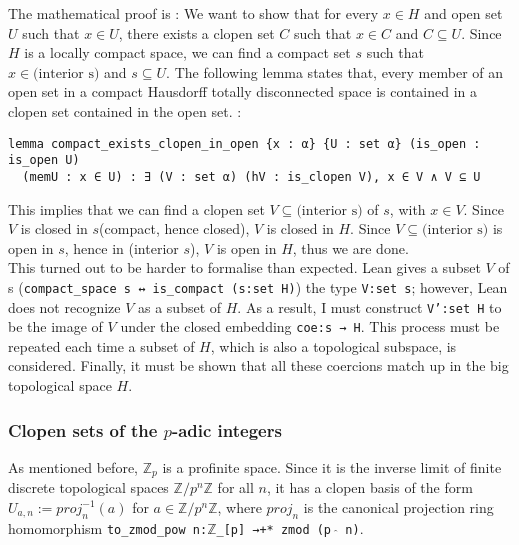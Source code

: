 \documentclass[a4paper,UKenglish,cleveref, autoref, thm-restate]{lipics-v2021}
\newcommand{\lean}[1]{\texttt{#1}\xspace} %
\begin{document}
The mathematical proof is : We want to show that for every $x \in H$ and open set $U$ such that
$x \in U$, there exists a clopen set $C$ such that $x \in C$ and $C \subseteq U$. Since $H$ is a
locally compact space, we can find a compact set $s$ such that $x \in \text{(interior s)}$ and
$s \subseteq U$. The following lemma states that, every member of an open set in a compact Hausdorff 
totally disconnected space is contained in a clopen set contained in the open set. :
\begin{lstlisting}
lemma compact_exists_clopen_in_open {x : α} {U : set α} (is_open : is_open U) 
  (memU : x ∈ U) : ∃ (V : set α) (hV : is_clopen V), x ∈ V ∧ V ⊆ U
\end{lstlisting}
This implies that we can find a clopen set $V \subseteq \text{(interior s)}$ of $s$, with $x \in V$. 
Since $V$ is closed in $s$(compact, hence closed), $V$ is closed in $H$. Since
$V \subseteq \text{(interior s)}$ is open in $s$, hence in (interior $s$), $V$ is open in $H$, thus
we are done. \\

This turned out to be harder to formalise than expected. Lean gives a subset $V$ of s \newline (\lean{compact\_space s ↔ is\_compact (s:set H)}) 
the type \lean{V:set s}; however, Lean does not recognize $V$ as a subset of $H$. As a result, I must construct \lean{V':set H} 
to be the image of $V$ under the closed embedding \lean{coe:s → H}. This process must be repeated each time a subset of $H$, 
which is also a topological subspace, is considered. Finally, it must be shown that all these coercions match up in the big 
topological space $H$.


\subsubsection{Clopen sets of the $p$-adic integers}
As mentioned before, $\mathbb{Z}_p$ is a profinite space. Since it is the inverse limit of finite
discrete topological spaces $\mathbb{Z}/p^n \mathbb{Z}$ for all $n$, it has a clopen basis of the
form $U_{a,n} := proj_n ^{-1} (a)$ for $a \in \mathbb{Z}/p^n \mathbb{Z}$, where $proj_n$ is the
canonical projection ring homomorphism \lean{to\_zmod\_pow n:$\mathbb{Z}$\_[p] →+* zmod (p $\hat{}$ n)}. \\
\end{document}

